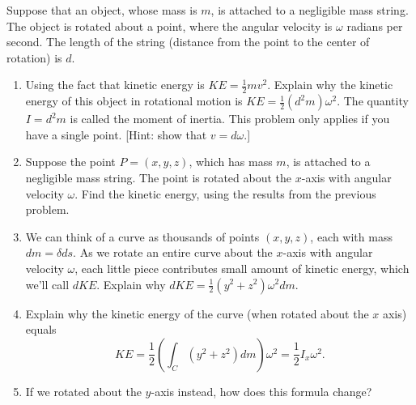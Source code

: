\begin{problem}%
%
%
 Suppose that an object, whose mass is $m$, is attached to a negligible mass string. The object is rotated about a point, where the angular velocity is $\omega$ radians per second. The length of the string (distance from the point to the center of rotation) is $d$.
 \begin{enumerate}
  \item  Using the fact that kinetic energy is $KE=\frac{1}{2}mv^2$. Explain why the kinetic energy of this object in rotational motion is $KE = \frac{1}{2}(d^2m)\omega^2$.  The quantity $I=d^2m$ is called the moment of inertia. This problem only applies if you have a single point. [Hint: show that $v=d\omega$.]
  \item Suppose the point $P=(x,y,z)$, which has mass $m$, is attached to a negligible mass string. The point is rotated about the $x$-axis with angular velocity $\omega$. Find the kinetic energy, using the results from the previous problem.
  \item We can think of a curve as thousands of points $(x,y,z)$, each with mass $dm=\delta ds$. As we rotate an entire curve about the $x$-axis with angular velocity $\omega$, each little piece contributes small amount of kinetic energy, which we'll call $dKE$.  Explain why $dKE = \frac{1}{2}(y^2+z^2) \omega^2 dm$.
  \item Explain why the kinetic energy of the curve (when rotated about the $x$ axis) equals 
$$KE= \frac{1}{2}\left(\int_C (y^2+z^2)dm\right)\omega^2=\frac{1}{2}I_x\omega^2.$$
  \item If we rotated about the $y$-axis instead, how does this formula change?
 \end{enumerate}
\end{problem}

